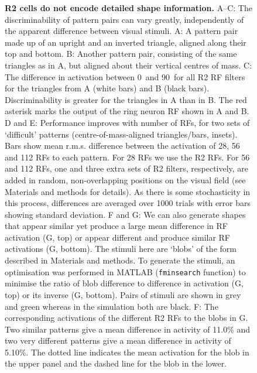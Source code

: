 \begin{figure}[htp]
	\caption{
		{\bf R2 cells do not encode detailed shape information.}
		A--C: The discriminability of pattern pairs can vary greatly, independently of the apparent difference between visual stimuli.
		A: A pattern pair made up of an upright and an inverted triangle, aligned along their top and bottom.
		B: Another pattern pair, consisting of the same triangles as in A, but aligned about their vertical centres of mass.
		C: The difference in activation between 0\degree\ and 90\degree\ for all R2 RF filters for the triangles from A (white bars) and B (black bars). Discriminability is greater for the triangles in A than in B. The red asterisk marks the output of the ring neuron RF shown in A and B.
		D and E: Performance improves with number of RFs, for two sets of `difficult' patterns (centre-of-mass-aligned triangles/bars, insets). Bars show mean r.m.s. difference between the activation of 28, 56 and 112 RFs to each pattern. For 28 RFs we use the R2 RFs. For 56 and 112 RFs, one and three extra sets of R2 filters, respectively, are added in random, non-overlapping positions on the visual field (see Materials and methods for details). As there is some stochasticity in this process, differences are averaged over 1000 trials with error bars showing standard deviation. 
		F and G: We can also generate shapes that appear similar yet produce a large mean difference in RF activation (G, top) or appear different and produce similar RF activations (G, bottom). The stimuli here are `blobs' of the form described in Materials and methods. To generate the stimuli, an optimisation was performed in MATLAB (\texttt{fminsearch} function) to minimise the ratio of blob difference to difference in activation (G, top) or its inverse (G, bottom). Pairs of stimuli are shown in grey and green whereas in the simulation both are black.
		F: The corresponding activations of the different R2 RFs to the blobs in G. Two similar patterns give a mean difference in activity of 11.0\% and two very different patterns give a mean difference in activity of 5.10\%. The dotted line indicates the mean activation for the blob in the upper panel and the dashed line for the blob in the lower.
	}
	\label{fig:simdiffpatts}
\end{figure}

